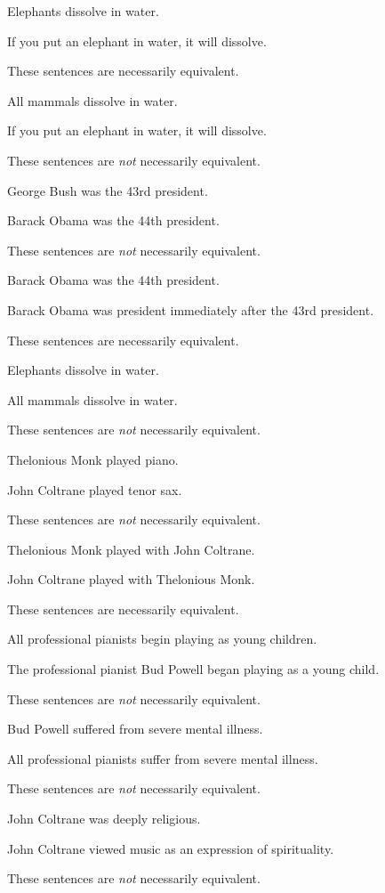 \problempart 

\begin{earg}
\item Elephants dissolve in water.
\item[]	If you put an elephant in water, it will dissolve.
\item[]These sentences are necessarily equivalent.\smallskip

\item All mammals dissolve in water.
\item[]	If you put an elephant in water, it will dissolve.
\item[] These sentences are \textit{not} necessarily equivalent.\smallskip 

\item George Bush was the 43rd president. 
\item[]	Barack Obama was the 44th president.
\item[] These sentences are \textit{not} necessarily equivalent.\smallskip
 
\item Barack Obama was the 44th president.
\item[]	Barack Obama was president immediately after the 43rd president.
\item[] These sentences are necessarily equivalent.\smallskip 

\item Elephants dissolve in water. 
\item[]	All mammals dissolve in water.
\item[] These sentences are \textit{not} necessarily equivalent.\smallskip

\item  Thelonious Monk played piano.
	\item[]	John Coltrane played tenor sax.
	\item[] These sentences are \textit{not} necessarily equivalent.\smallskip 
\item  Thelonious Monk played with John Coltrane.
	\item[]	John Coltrane played with Thelonious Monk.
	\item[] These sentences are necessarily equivalent.\smallskip
	
\item  All professional pianists begin playing as young children.
	\item[]	The professional pianist Bud Powell began playing as a young child.
	\item[] These sentences are \textit{not} necessarily equivalent.\smallskip
\item  Bud Powell suffered from severe mental illness.
	\item[]	All professional pianists suffer from severe mental illness.
	\item[] These sentences are \textit{not} necessarily equivalent.\smallskip
\item John Coltrane was deeply religious.	
\item[]	John Coltrane viewed music as an expression of spirituality.
\item[] These sentences are \textit{not} necessarily equivalent. 
\end{earg}

